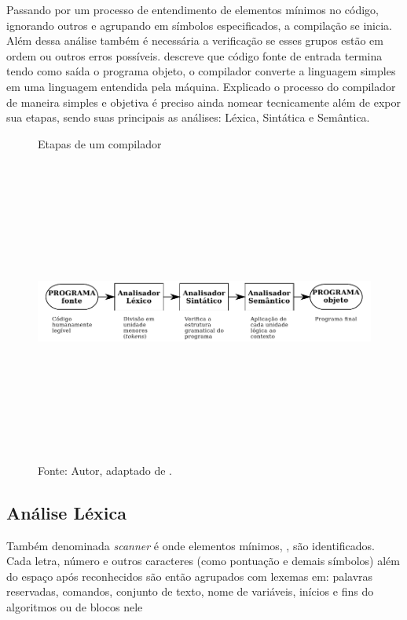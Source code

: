 Passando por um processo de entendimento de elementos mínimos no código, ignorando outros e agrupando em símbolos especificados, a compilação se inicia. Além dessa análise também é necessária a verificação se esses grupos estão em ordem ou outros erros possíveis.  descreve que código fonte de entrada termina tendo como saída o programa objeto, o compilador converte a linguagem simples em uma linguagem entendida pela máquina. Explicado o processo do compilador de maneira simples e objetiva é preciso ainda nomear tecnicamente além de expor sua etapas, sendo suas principais as análises: Léxica, Sintática e Semântica.

\begin{figure}[h]
  \caption{\ifdraft{\color{green}}{}Etapas de um compilador}\label{fig:compilador}
  \centering
\includegraphics[width=\textwidth,height=10cm,keepaspectratio]{figures/etapas-compilador.pdf}
  \caption*{\ifdraft{\color{green}}{}\footnotesize Fonte: Autor, adaptado de .}
\end{figure}

%
\subsection{Análise Léxica}

Também denominada \textit{scanner} é onde elementos mínimos, , são identificados. Cada letra, número e outros caracteres (como pontuação e demais símbolos)  além do espaço após reconhecidos são então agrupados com lexemas em: palavras reservadas, comandos, conjunto de texto, nome de variáveis, inícios e fins do algoritmos ou de blocos nele

